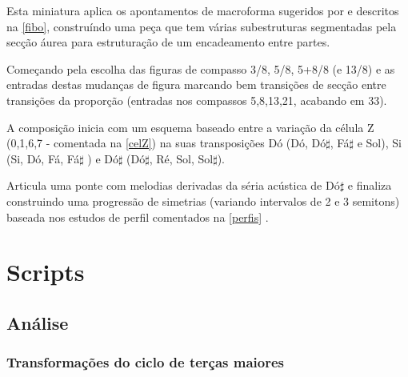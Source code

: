 \documentclass[
	12pt,				%
	openright,			%
	twoside,			%
	a4paper,			%
	english,			%
	french,				%
	spanish,			%
	brazil				%
	]{abntex2}
\begin{document}
Esta miniatura aplica os apontamentos de macroforma sugeridos por  e descritos na \autoref{fibo}, construíndo uma peça que tem várias subestruturas segmentadas pela secção áurea para estruturação de um encadeamento entre partes. 

Começando pela escolha das figuras de compasso 3/8, 5/8, 5+8/8 (e 13/8) e as entradas destas mudanças de figura marcando bem transições de secção entre transições da proporção (entradas nos compassos 5,8,13,21, acabando em 33).

A composição inicia com um esquema baseado entre a variação da célula Z (0,1,6,7 - comentada na \autoref{celZ}) na suas transposições Dó (Dó, Dó$\sharp$, Fá$\sharp $ e Sol), Si (Si, Dó, Fá, Fá$\sharp $ ) e Dó$\sharp$ (Dó$\sharp$, Ré, Sol, Sol$\sharp$). 

Articula uma ponte com melodias derivadas da séria acústica de Dó$\sharp$ e finaliza construindo uma progressão de simetrias (variando intervalos de 2 e 3 semitons) baseada nos estudos de perfil comentados na \autoref{perfis} .


\chapter{Scripts}
\label{scripts}

\section{Análise}

\subsection{Transformações do ciclo de terças maiores}
\label{ciclotercas}
\end{document}
